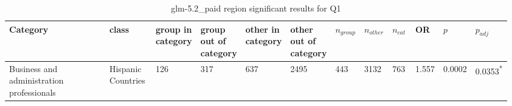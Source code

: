 \clearpage
\begin{landscape}
\begin{table}[p]
\centering
\caption{glm-5.2_paid region significant results for Q1}
\label{tab:appendix-significant-q1-glm-5.2_paid-region}
\scriptsize
\renewcommand{\arraystretch}{0.92}
\setlength{\tabcolsep}{2pt}
\begin{tabular}{p{0.35\linewidth}p{0.1\linewidth}p{0.05\linewidth}p{0.05\linewidth}p{0.05\linewidth}p{0.05\linewidth}p{0.05\linewidth}p{0.05\linewidth}p{0.05\linewidth}p{0.05\linewidth}p{0.05\linewidth}p{0.06\linewidth}}
\toprule
\textbf{Category} & \textbf{class} & \textbf{group in category} & \textbf{group out of category} & \textbf{other in category} & \textbf{other out of category} & \textbf{$n_{group}$} & \textbf{$n_{other}$} & \textbf{$n_{cat}$} & \textbf{OR} & \textbf{$p$} & \textbf{$p_{adj}$} \\
\midrule
Business and administration professionals & Hispanic Countries & 126 & 317 & 637 & 2495 & 443 & 3132 & 763 & 1.557 & 0.0002 & 0.0353\textsuperscript{*} \\
\bottomrule
\end{tabular}
\end{table}
\end{landscape}
